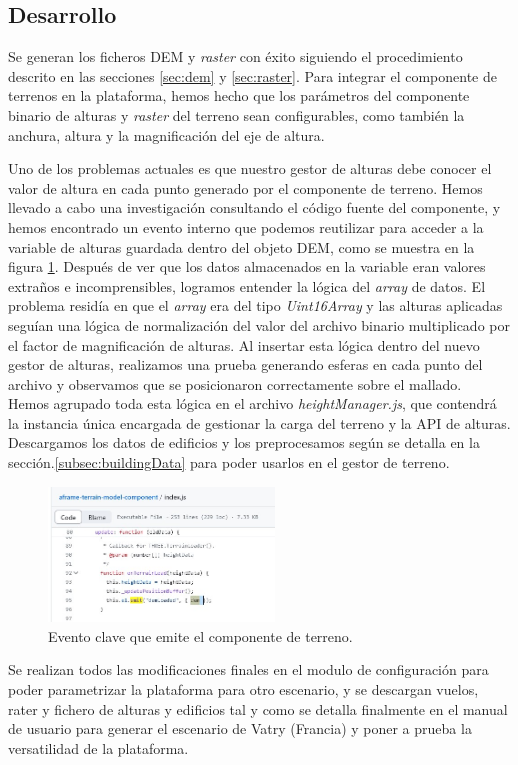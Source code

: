 \documentclass[a4paper, 11pt]{book}
\begin{document}
\subsection{Desarrollo}
Se generan los ficheros \textsc{DEM} y \emph{raster} con éxito siguiendo el procedimiento descrito en las secciones \ref{sec:dem} y \ref{sec:raster}. Para integrar el componente de terrenos en la plataforma, hemos hecho que los parámetros del componente binario de alturas y \emph{raster} del terreno sean configurables, como también la anchura, altura y la magnificación del eje de altura.

Uno de los problemas actuales es que nuestro gestor de alturas debe conocer el valor de altura en cada punto generado por el componente de terreno. Hemos llevado a cabo una investigación consultando el código fuente del componente, y hemos encontrado un evento interno que podemos reutilizar para acceder a la variable de alturas guardada dentro del objeto \textsc{DEM}, como se muestra en la figura \ref{fig:terrain_evento}. Después de ver que los datos almacenados en la variable eran valores extraños e incomprensibles, logramos entender la lógica del \emph{array} de datos. 
El problema residía en que el \emph{array} era del tipo \emph{Uint16Array} y las alturas aplicadas seguían una lógica de normalización del valor del archivo binario multiplicado por el factor de magnificación de alturas. Al insertar esta lógica dentro del nuevo gestor de alturas, realizamos una prueba generando esferas en cada punto del archivo y observamos que se posicionaron correctamente sobre el mallado.\\
Hemos agrupado toda esta lógica en el archivo \emph{heightManager.js}, que contendrá la instancia única encargada de gestionar la carga del terreno y la \textsc{API} de alturas.\\
Descargamos los datos de edificios y los preprocesamos según se detalla en la sección.\ref{subsec:buildingData} para poder usarlos en el gestor de terreno.

\begin{figure}[h]
  \centering
  \includegraphics[width=6cm, keepaspectratio]{img/terrain_evento.jpg}
  \caption{Evento clave que emite el componente de terreno.}
  \label{fig:terrain_evento}
\end{figure}
Se realizan todos las modificaciones finales en el modulo de configuración para poder parametrizar la plataforma para otro escenario, y se descargan vuelos, rater y fichero de alturas y edificios tal y como se detalla finalmente en el manual de usuario para generar el escenario de Vatry (Francia) y poner a prueba la versatilidad de la plataforma.
\end{document}
